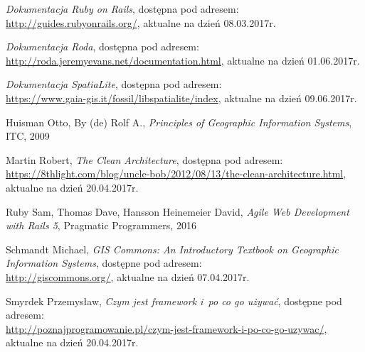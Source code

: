 \documentclass[printmode]{mgr}
\begin{document}
\begin{thebibliography}{inz}
  \emph{Dokumentacja Ruby on Rails}, dostępna pod adresem:\\ \url{http://guides.rubyonrails.org/}, aktualne na dzień 08.03.2017r.

  \emph{Dokumentacja Roda}, dostępna pod adresem:\\ \url{http://roda.jeremyevans.net/documentation.html}, aktualne na dzień 01.06.2017r.

  \emph{Dokumentacja SpatiaLite}, dostępna pod adresem:\\ \url{https://www.gaia-gis.it/fossil/libspatialite/index}, aktualne na dzień 09.06.2017r.

  Huisman Otto, By (de) Rolf A., \emph{Principles of Geographic Information Systems}, ITC, 2009

  Martin Robert, \emph{The Clean Architecture}, dostępna pod adresem:\\ \url{https://8thlight.com/blog/uncle-bob/2012/08/13/the-clean-architecture.html}, aktualne na dzień 20.04.2017r.

  Ruby Sam, Thomas Dave, Hansson Heinemeier David, \emph{Agile Web Development with Rails 5}, Pragmatic Programmers, 2016

  Schmandt Michael, \emph{GIS Commons: An Introductory Textbook on Geographic Information Systems}, dostępne pod adresem:\\
  \url{http://giscommons.org/}, aktualne na dzień 07.04.2017r.

  Smyrdek Przemysław, \emph{Czym jest framework i~po co go używać}, dostępne pod adresem:\\
  \url{http://poznajprogramowanie.pl/czym-jest-framework-i-po-co-go-uzywac/}, aktualne na dzień 20.04.2017r.
  
  
 
\end{thebibliography}
\end{document}
